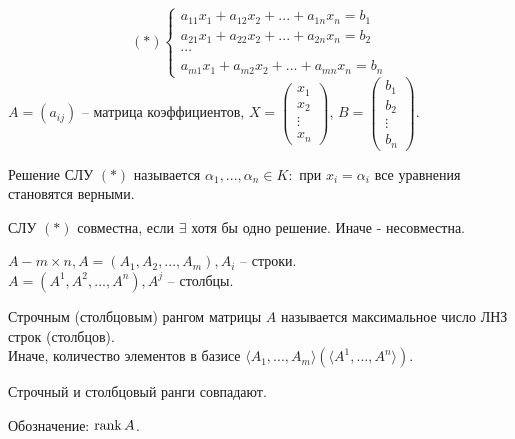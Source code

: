 


	\Header
	\BeginConspect


	\[ (*)\begin{cases}
		a_{11} x_1 + a_{12} x_2 + ... + a_{1n} x_n = b_1 \\ 
		a_{21} x_1 + a_{22} x_2 + ... + a_{2n} x_n = b_2 \\ 
		\cdots\\
		a_{m1} x_1 + a_{m2} x_2 + ... + a_{mn} x_n = b_n
	\end{cases}\]
	$A = (a_{ij})$ -- матрица коэффициентов, $X = \begin{pmatrix}
	x_1 \\ 
	x_2 \\ 
	\vdots \\ 
	x_n
	\end{pmatrix}$, $B = \begin{pmatrix}
	b_1 \\ 
	b_2 \\ 
	\vdots \\ 
	b_n
	\end{pmatrix}$.  

	\begin{Def}
		Решение СЛУ $(*)$ называется $\alpha_1, ..., \alpha_n \in K : $ при $x_i = \alpha_i$ все уравнения становятся верными.
	\end{Def}

	\begin{Def}
		СЛУ $(*)$ совместна, если $\exists$ хотя бы одно решение. Иначе - несовместна.
	\end{Def}


	$A - m \times n, A = (A_1, A_2, ..., A_m), A_i$ -- строки. \\
	$A = (A^1, A^2, ..., A^n), A^j$ -- столбцы.
	
	\begin{Def}
		Строчным (столбцовым) рангом матрицы $A$ называется максимальное число ЛНЗ строк (столбцов). \\
		Иначе, количество элементов в базисе $\langle A_1, ..., A_m\rangle (\langle A^1, ..., A^n\rangle)$. 
	\end{Def}

	\begin{Thm}
		Строчный и столбцовый ранги совпадают.
	\end{Thm}

	Обозначение: $\operatorname{rank} A$.


